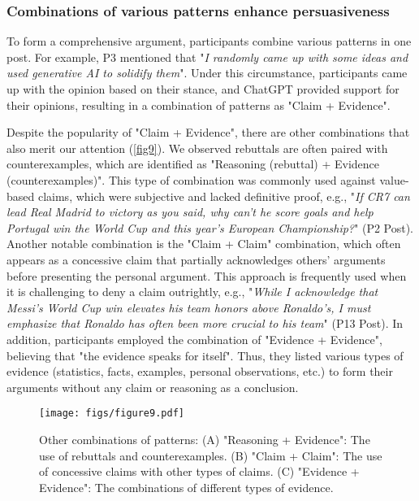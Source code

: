 \subsubsection{Combinations of various patterns enhance persuasiveness}
To form a comprehensive argument, participants combine various patterns in one post. For example, P3 mentioned that "\textit{I randomly came up with some ideas and used generative AI to solidify them}". Under this circumstance, participants came up with the opinion based on their stance, and ChatGPT provided support for their opinions, resulting in a combination of patterns as "Claim + Evidence".


Despite the popularity of "Claim + Evidence", there are other combinations that also merit our attention (\autoref{fig9}). We observed rebuttals are often paired with counterexamples, which are identified as "Reasoning (rebuttal) + Evidence (counterexamples)". This type of combination was commonly used against value-based claims, which were subjective and lacked definitive proof, e.g., "\textit{If CR7 can lead Real Madrid to victory as you said, why can't he score goals and help Portugal win the World Cup and this year's European Championship?}" (P2 Post). Another notable combination is the "Claim + Claim" combination, which often appears as a concessive claim that partially acknowledges others' arguments before presenting the personal argument. This approach is frequently used when it is challenging to deny a claim outrightly, e.g., "\textit{While I acknowledge that Messi's World Cup win elevates his team honors above Ronaldo's, I must emphasize that Ronaldo has often been more crucial to his team}" (P13 Post). In addition, participants employed the combination of "Evidence + Evidence", believing that "the evidence speaks for itself". Thus, they listed various types of evidence (statistics, facts, examples, personal observations, etc.) to form their arguments without any claim or reasoning as a conclusion.

\begin{figure*}
    \centering
    \texttt{[image: figs/figure9.pdf]}
    \caption{Other combinations of patterns: (A) "Reasoning + Evidence": The use of rebuttals and counterexamples. (B) "Claim + Claim":
The use of concessive claims with other types of claims. (C) "Evidence + Evidence": The combinations of different types of evidence.}
    \label{fig9}
\end{figure*}

